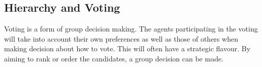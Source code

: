 




\subsection{Hierarchy and Voting}
Voting is a form of group decision making. The agents participating in the voting will take into account their own preferences as well as those of others when making decision about how to vote. This will often have a strategic flavour. By aiming to rank or order the candidates, a group decision can be made.

